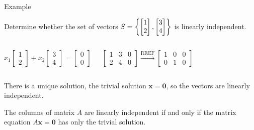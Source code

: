 \documentclass[xcolor=dvipsnames,aspectratio=169,t]{beamer}
\begin{document}
\begin{frame}{Example}

  \bigskip
  Determine whether the set of vectors $\displaystyle S = \left\{ \begin{bmatrix} 1 \\ 2 \end{bmatrix} ,  \begin{bmatrix} 3 \\ 4 \end{bmatrix}  \right\}$ is linearly independent.

  \begin{columns}

    \column{0.5\tw}
    
    \[ x_1 \begin{bmatrix} 1 \\ 2 \end{bmatrix} + x_2 \begin{bmatrix} 3 \\ 4 \end{bmatrix}  =  \begin{bmatrix} 0 \\ 0 \end{bmatrix}  \]

\column{0.5\tw}
        
    \[ \begin{bmatrix} 1 & 3  & 0\\
      2 & 4 & 0 \end{bmatrix} \xrightarrow{\text{RREF}}
    \begin{bmatrix}
      1 & 0 & 0 \\
      0 & 1 & 0 \end{bmatrix} \]

  \end{columns}
  \bigskip
  
  \pause
  
  There is a unique solution, the trivial solution $\mathbf{x} = \mathbf{0}$, so the vectors are \alert{linearly independent}.

  \bigskip
  
  \bbox
  The columns of matrix $A$ are linearly independent if and only if the matrix equation $A\mathbf{x} = \mathbf{0}$ has \alert{only the trivial solution}.
  \ebox

\end{frame}
\end{document}
